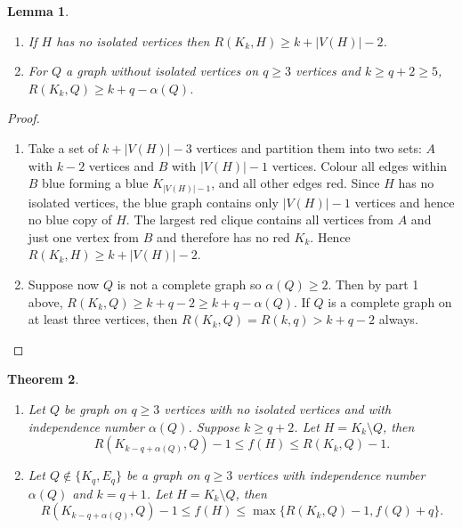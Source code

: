 \documentclass[a4paper,12pt]{article}
\newtheorem{theorem}{Theorem}[section]
\newtheorem{lemma}[theorem]{Lemma}
\begin{document}
\begin{lemma} \label{indlemma}
$\mbox{  }$
\begin{enumerate}
\item{If $H$ has no isolated vertices then $R(K_k , H)  \geq k + |V(H)|  - 2$.}
\item{For $Q$ a graph without isolated vertices  on $q \geq 3$ vertices and  $k \geq  q +2  \geq  5$,  $R(K_k ,Q) \geq  k +q  - \alpha(Q)$.}
\end{enumerate}
\end{lemma}
\begin{proof}
$\mbox{  }$
\begin{enumerate}
\item{Take a set of $k + |V(H)| - 3$ vertices and partition them into two sets: $A$ with $k-2$ vertices and $B$  with $|V(H)|-1$ vertices.  Colour all edges within $B$ blue forming a blue $K_{|V(H)| - 1}$, and all other edges red.  Since $H$ has no isolated vertices, the blue graph contains only $|V(H)| - 1$ vertices and hence no blue copy of $H$. The largest red clique contains all vertices from $A$ and just one vertex from $B$ and therefore has no red $K_k$.  Hence $R(K_k , H) \geq k +|V(H)| - 2$.}
\item{Suppose now $Q$ is not a complete graph  so  $\alpha(Q) \geq 2$.  Then  by part 1 above, $R(K_k ,Q) \geq  k +q - 2 \geq k +q - \alpha(Q)$.  If $Q$ is a complete graph on at least three vertices,  then $R(K_k ,Q)  = R(k,q) > k + q - 2$  always.}
\end{enumerate}
\end{proof}

 
\begin{theorem}
$\mbox{ }$
\begin{enumerate}
\item{Let $Q$ be graph on $q \ge 3$ vertices with no isolated vertices and with independence number $\alpha(Q)$. Suppose $k \ge q + 2$. Let $H = K_k \setminus Q$, then \[R(K_{k-q+\alpha(Q)}, Q) - 1 \le f(H) \le R(K_k, Q) - 1.\]}
\item{Let $Q \notin \{K_q, E_q\}$ be a graph on $q \ge 3$ vertices with independence number $\alpha(Q)$ and $k = q+1$. Let $H = K_k \setminus Q$, then \[R(K_{k-q+\alpha(Q)}, Q) - 1 \le f(H) \le \max\{R(K_k, Q) - 1, f(Q) + q\}.\]}
\end{enumerate}
\end{theorem}
 
\end{document}
